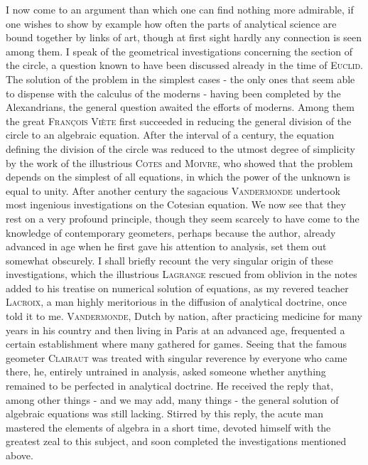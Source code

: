 \documentclass[11pt]{article}
\newcommand{\scn}[1]{\textsc{#1}}
\begin{document}
I now come to an argument than which one can find nothing more admirable, if one wishes to show by example how often the parts of analytical science are bound together by links of art, though at first sight hardly any connection is seen among them. I speak of the geometrical investigations concerning the section of the circle, a question known to have been discussed already in the time of \scn{Euclid}. The solution of the problem in the simplest cases - the only ones that seem able to dispense with the calculus of the moderns - having been completed by the Alexandrians, the general question awaited the efforts of moderns. Among them the great \scn{François Viète} first succeeded in reducing the general division of the circle to an algebraic equation. After the interval of a century, the equation defining the division of the circle was reduced to the utmost degree of simplicity by the work of the illustrious \scn{Cotes} and \scn{Moivre}, who showed that the problem depends on the simplest of all equations, in which the power of the unknown is equal to unity. After another century the sagacious \scn{Vandermonde} undertook most ingenious investigations on the Cotesian equation. We now see that they rest on a very profound principle, though they seem scarcely to have come to the knowledge of contemporary geometers, perhaps because the author, already advanced in age when he first gave his attention to analysis, set them out somewhat obscurely. I shall briefly recount the very singular origin of these investigations, which the illustrious \scn{Lagrange} rescued from oblivion in the notes added to his treatise on numerical solution of equations, as my revered teacher \scn{Lacroix}, a man highly meritorious in the diffusion of analytical doctrine, once told it to me. \scn{Vandermonde}, Dutch by nation, after practicing medicine for many years in his country and then living in Paris at an advanced age, frequented a certain establishment where many gathered for games. Seeing that the famous geometer \scn{Clairaut} was treated with singular reverence by everyone who came there, he, entirely untrained in analysis, asked someone whether anything remained to be perfected in analytical doctrine. He received the reply that, among other things - and we may add, many things - the general solution of algebraic equations was still lacking. Stirred by this reply, the acute man mastered the elements of algebra in a short time, devoted himself with the greatest zeal to this subject, and soon completed the investigations mentioned above.
\end{document}
